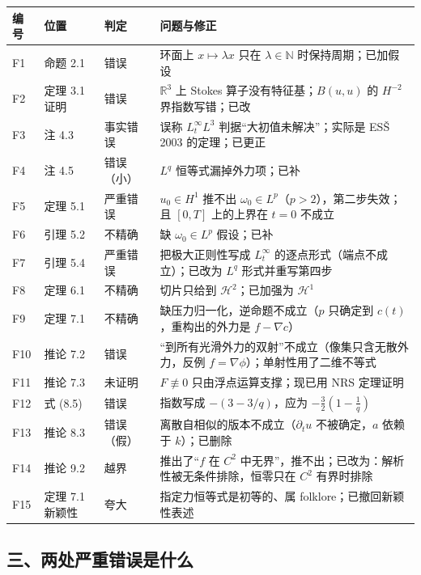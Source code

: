 \documentclass[11pt,a4paper]{article}
\begin{document}
\begin{center}
\small
\begin{tabular}{@{}p{1.0cm}p{2.6cm}p{2.0cm}p{7.6cm}@{}}
\toprule
编号 & 位置 & 判定 & 问题与修正\\
\midrule
F1 & 命题 2.1 & 错误 & 环面上 $x\mapsto\lambda x$ 只在 $\lambda\in\mathbb N$ 时保持周期；已加假设\\
F2 & 定理 3.1 证明 & 错误 & $\mathbb R^3$ 上 Stokes 算子没有特征基；$B(u,u)$ 的 $H^{-2}$ 界指数写错；已改\\
F3 & 注 4.3 & 事实错误 & 误称 $L^\infty_tL^3$ 判据“大初值未解决”；实际是 ES\v{S} 2003 的定理；已更正\\
F4 & 注 4.5 & 错误（小） & $L^q$ 恒等式漏掉外力项；已补\\
F5 & 定理 5.1 & 严重错误 & $u_0\in H^1$ 推不出 $\omega_0\in L^p$（$p>2$），第二步失效；且 $[0,T]$ 上的上界在 $t=0$ 不成立 \\
F6 & 引理 5.2 & 不精确 & 缺 $\omega_0\in L^p$ 假设；已补\\
F7 & 引理 5.4 & 严重错误 & 把极大正则性写成 $L^\infty_t$ 的逐点形式（端点不成立）；已改为 $L^q$ 形式并重写第四步\\
F8 & 定理 6.1 & 不精确 & 切片只给到 $\mathcal H^2$；已加强为 $\mathcal H^1$\\
F9 & 定理 7.1 & 不精确 & 缺压力归一化，逆命题不成立（$p$ 只确定到 $c(t)$，重构出的外力是 $f-\nabla c$）\\
F10 & 推论 7.2 & 错误 & “到所有光滑外力的双射”不成立（像集只含无散外力，反例 $f=\nabla\phi$）；单射性用了二维不等式\\
F11 & 推论 7.3 & 未证明 & $F\not\equiv0$ 只由浮点运算支撑；现已用 NRS 定理证明\\
F12 & 式 (8.5) & 错误 & 指数写成 $-(3-3/q)$，应为 $-\tfrac32(1-\tfrac1q)$\\
F13 & 推论 8.3 & 错误（假） & 离散自相似的版本不成立（$\partial_tu$ 不被确定，$a$ 依赖于 $k$）；已删除\\
F14 & 推论 9.2 & 越界 & 推出了“$f$ 在 $C^2$ 中无界”，推不出；已改为：解析性被无条件排除，恒零只在 $C^2$ 有界时排除\\
F15 & 定理 7.1 新颖性 & 夸大 & 指定力恒等式是初等的、属 folklore；已撤回新颖性表述\\
\bottomrule
\end{tabular}
\end{center}

\subsection*{三、两处严重错误是什么}
\end{document}
